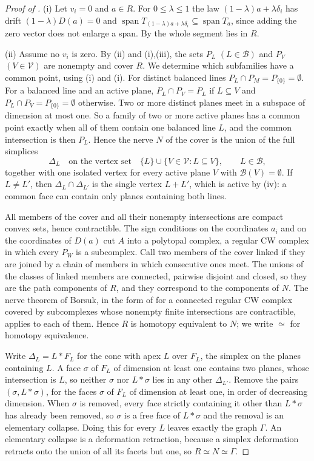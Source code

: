 \documentclass[11pt]{article}
\theoremstyle{remark}
\DeclareMathOperator{\spn}{span}
\begin{document}
\begin{proof}[Proof of ]
(i) Let $v_i=0$ and $a\in R$. For $0\le\lambda\le 1$ the law $(1-\lambda)a+\lambda \delta_i$ has drift $(1-\lambda)D(a)=0$
and $\spn T_{(1-\lambda)a+\lambda \delta_i}\subseteq\spn T_a$, since adding the zero vector does not enlarge a span. By
 the whole segment lies in $R$.

(ii) Assume no $v_i$ is zero. By (ii) and (i),(iii), the sets $P_L$ $(L\in\mathcal B)$
and $P_V$ $(V\in\mathcal V)$ are nonempty and cover $R$. We determine which subfamilies have a common point, using
(i) and (i). For distinct balanced lines $P_L\cap P_M=P_{\{0\}}=\emptyset$. For a
balanced line and an active plane, $P_L\cap P_V=P_L$ if $L\subseteq V$ and $P_L\cap P_V=P_{\{0\}}=\emptyset$ otherwise.
Two or more distinct planes meet in a subspace of dimension at most one. So a family of two or more active planes has a
common point exactly when all of them contain one balanced line $L$, and the common intersection is then $P_L$. Hence
the nerve $N$ of the cover is the union of the full simplices
\[
\Delta_L\quad\text{on the vertex set}\quad\{L\}\cup\{V\in\mathcal V:L\subseteq V\},\qquad L\in\mathcal B,
\]
together with one isolated vertex for every active plane $V$ with $\mathcal B(V)=\emptyset$. If $L\neq L'$, then
$\Delta_L\cap\Delta_{L'}$ is the single vertex $L+L'$, which is active by (iv): a common face can contain
only planes containing both lines.

All members of the cover and all their nonempty intersections are compact convex sets, hence contractible. The sign
conditions on the coordinates $a_i$ and on the coordinates of $D(a)$ cut $A$ into a polytopal complex, a regular
CW complex in which every $P_W$ is a subcomplex. Call two members of the cover linked if they are joined by a chain
of members in which consecutive ones meet. The unions of the classes of linked members are connected, pairwise
disjoint and closed, so they are the path components of $R$, and they correspond to the components of $N$. The
nerve theorem of Borsuk, in the form of \cite[Theorem~6 and Remark~7]{Bjorner2003}
for a connected regular CW complex covered by subcomplexes whose nonempty finite intersections are contractible,
applies to each of them. Hence $R$ is homotopy equivalent to $N$; we write $\simeq$ for homotopy equivalence.

Write $\Delta_L=L*F_L$ for the cone with apex $L$ over $F_L$, the simplex on the planes containing $L$. A face $\sigma$ of $F_L$ of dimension
at least one contains two planes, whose intersection is $L$, so neither $\sigma$ nor $L*\sigma$ lies in any other
$\Delta_{L'}$. Remove the pairs $(\sigma,L*\sigma)$, for the faces $\sigma$ of $F_L$ of dimension at least one, in order of
decreasing dimension. When $\sigma$ is removed, every face strictly containing it other than $L*\sigma$ has already been
removed, so $\sigma$ is a free face of $L*\sigma$ and the removal is an elementary collapse. Doing this for every $L$
leaves exactly the graph $\Gamma$. An elementary collapse is a deformation retraction, because a simplex deformation
retracts onto the union of all its facets but one, so $R\simeq N\simeq\Gamma$.


\end{proof}
\end{document}
